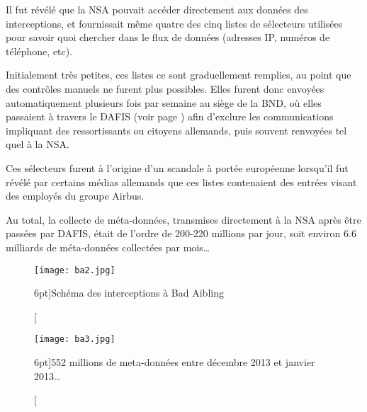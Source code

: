Il fut révélé que la NSA pouvait accéder directement aux données
des interceptions, et fournissait même quatre des cinq listes de sélecteurs
utilisées pour savoir quoi chercher dans le flux de données (adresses IP,
numéros de téléphone, etc). 

Initialement très petites, ces listes ce sont graduellement
remplies, au point que des contrôles manuels ne furent plus possibles. Elles
furent donc envoyées automatiquement plusieurs fois par semaine au siège de la
BND, où elles passaient à travers le DAFIS (voir page \pageref{dafis}) afin
d'exclure les communications impliquant des ressortissants ou citoyens
allemands, puis souvent renvoyées tel quel à la NSA.

Ces sélecteurs furent à l'origine d'un scandale à portée européenne
lorsqu'il fut révélé par certains médias allemands que ces listes contenaient
des entrées visant des employés du groupe Airbus\cite{airbus}.

Au total, la collecte de méta-données, transmises directement à la
NSA après être passées par DAFIS, était de l'ordre de 200-220 millions par jour,
soit environ 6.6 milliards de méta-données collectées par mois\ldots\cite{meta}


\begin{figure}
\texttt{[image: ba2.jpg]}
\caption[Schéma des interceptions à Bad Aibling][6pt]{Schéma des interceptions à Bad Aibling}
\label{fig:ba2}
\end{figure}


\begin{figure}
\texttt{[image: ba3.jpg]}
\caption[Capture écran de BOUNDLESSINFORMANT pour l'Allemagne][6pt]{552 millions
de meta-données entre décembre 2013 et janvier 2013\ldots}
\label{fig:ba3}
\end{figure}